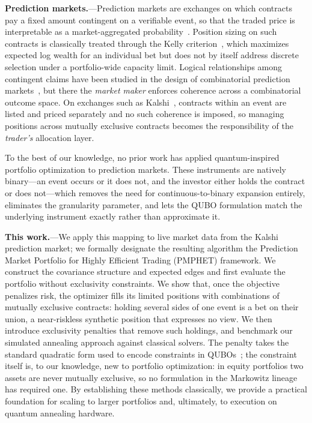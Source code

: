 \documentclass[aps, reprint, prl, twocolumn, superscriptaddress,amsmath,amssymb,noeprint]{revtex4-2}
\begin{document}
\textbf{Prediction markets.}---Prediction markets are exchanges on which
contracts pay a fixed amount contingent on a verifiable event, so that
the traded price is interpretable as a market-aggregated
probability~\cite{wolfers2004,arrow2008}.  Position sizing on such
contracts is classically treated through the Kelly
criterion~\cite{kelly1956,thorp2006}, which maximizes expected log wealth
for an individual bet but does not by itself address discrete selection
under a portfolio-wide capacity limit.  Logical relationships among
contingent claims have been studied in the design of combinatorial
prediction markets~\cite{hanson2003,chen2007}, but there the
\emph{market maker} enforces coherence across a combinatorial outcome
space.  On exchanges such as Kalshi~\cite{kalshi}, contracts within an
event are listed and priced separately and no such coherence is imposed,
so managing positions across mutually exclusive contracts becomes the responsibility
of the \emph{trader's} allocation layer.

To the best of our knowledge, no prior work has applied quantum-inspired
portfolio optimization to prediction markets.  These instruments are
natively binary---an event occurs or it does not, and the investor either
holds the contract or does not---which removes the need for
continuous-to-binary expansion entirely, eliminates the granularity
parameter, and lets the QUBO formulation match the underlying instrument
exactly rather than approximate it.

\textbf{This work.}---We apply this mapping to live market data from the
Kalshi prediction market; we formally designate the resulting algorithm
the Prediction Market Portfolio for Highly Efficient Trading (PMPHET)
framework.  We construct the covariance structure and expected edges and
first evaluate the portfolio without exclusivity constraints.  We show
that, once the objective penalizes risk, the optimizer fills its limited
positions with combinations of mutually exclusive contracts: holding
several sides of one event is a bet on their union, a near-riskless
synthetic position that expresses no view.  We then introduce exclusivity
penalties that remove such holdings, and benchmark our simulated
annealing approach against classical solvers.  The penalty takes the
standard quadratic form used to encode constraints in
QUBOs~\cite{lucas2014}; the constraint itself is, to our knowledge, new
to portfolio optimization: in equity portfolios two assets are never
mutually exclusive, so no formulation in the Markowitz lineage has
required one.  By establishing these
methods classically, we provide a practical foundation for scaling to
larger portfolios and, ultimately, to execution on quantum annealing
hardware.
\end{document}
